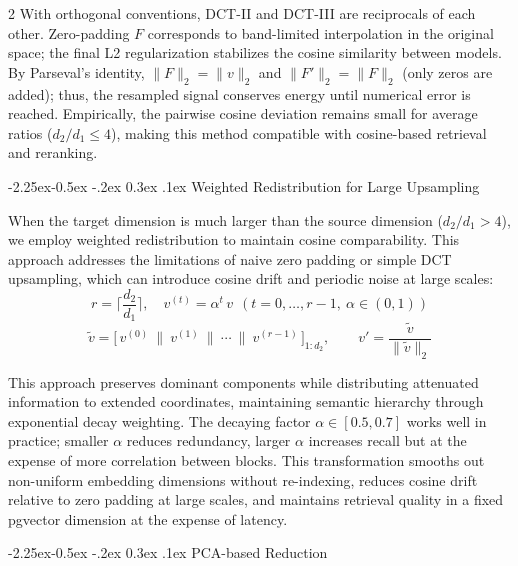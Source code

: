 \documentclass[10pt,letterpaper]{article}
\makeatletter
\renewcommand{\subsubsection}{\@startsection{subsubsection}{3}{\z@}%
                                     {-2.25ex\@plus -0.5ex \@minus -.2ex}%
                                     {0.3ex \@plus .1ex}%
                                     {\normalfont\normalsize\itshape}}
\makeatother
\begin{document}
\begin{multicols}{2}
With orthogonal conventions, DCT-II and DCT-III are reciprocals of each other. Zero-padding $F$ corresponds to band-limited interpolation in the original space; the final L2 regularization stabilizes the cosine similarity between models. By Parseval's identity, $\lVert F\rVert_2=\lVert v\rVert_2$ and $\lVert F'\rVert_2=\lVert F\rVert_2$ (only zeros are added); thus, the resampled signal conserves energy until numerical error is reached. Empirically, the pairwise cosine deviation remains small for average ratios ($d_2/d_1\!\le\!4$), making this method compatible with cosine-based retrieval and reranking.

\subsubsection{Weighted Redistribution for Large Upsampling}

When the target dimension is much larger than the source dimension ($d_2/d_1>4$), we employ weighted redistribution to maintain cosine comparability. This approach addresses the limitations of naive zero padding or simple DCT upsampling, which can introduce cosine drift and periodic noise at large scales:
\begin{equation}
r=\Big\lceil \frac{d_2}{d_1}\Big\rceil,\quad v^{(t)}=\alpha^{t}\,v\ \ (t=0,\dots,r-1,\ \alpha\in(0,1))
\end{equation}
\begin{equation}
\tilde v=\big[\,v^{(0)}\ \|\ v^{(1)}\ \|\ \cdots\ \|\ v^{(r-1)}\,\big]_{1:d_2},\qquad v'=\frac{\tilde v}{\lVert \tilde v\rVert_2}
\end{equation}

This approach preserves dominant components while distributing attenuated information to extended coordinates, maintaining semantic hierarchy through exponential decay weighting. The decaying factor $\alpha\in[0.5,0.7]$ works well in practice; smaller $\alpha$ reduces redundancy, larger $\alpha$ increases recall but at the expense of more correlation between blocks. This transformation smooths out non-uniform embedding dimensions without re-indexing, reduces cosine drift relative to zero padding at large scales, and maintains retrieval quality in a fixed pgvector dimension at the expense of latency.

\subsubsection{PCA-based Reduction}


\end{multicols}
\end{document}
